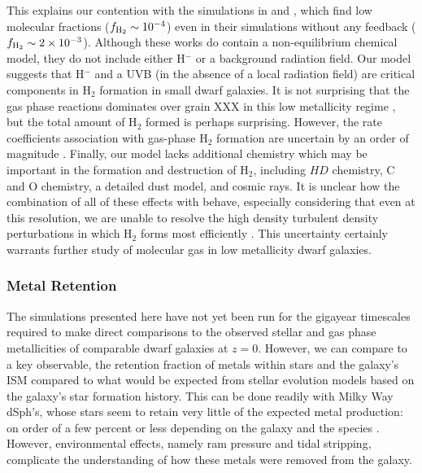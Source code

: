 \documentclass[twocolumn]{aastex61}
\begin{document}
This explains our contention with the simulations in \citet{Hu2016} and \citet{Hu2017}, which find low molecular fractions ($f_{\rm H_2} \sim 10^{-4}$) even in their simulations without any feedback ($f_{\rm H_2} \sim 2 \times 10^{-3}$). Although these works do contain a non-equilibrium chemical model, they do not include either H$^{-}$ or a background radiation field. Our model suggests that H$^{-}$ and a UVB (in the absence of a local radiation field) are critical components in H$_2$ formation in small dwarf galaxies. It is not surprising that the gas phase reactions dominates over grain XXX in this low metallicity regime \citep{Glover2003}, but the total amount of H$_2$ formed is perhaps surprising. However, the rate coefficients association with gas-phase H$_2$ formation are uncertain by an order of magnitude \citep{Glover2006,Glover2007}.
Finally, our model lacks additional chemistry which may be important in the formation and destruction of H$_2$, including $HD$ chemistry, C and O chemistry, a detailed dust model, and cosmic rays. It is unclear how the combination of all of these effects with behave, especially considering that even at this resolution, we are unable to resolve the high density turbulent density perturbations in which H$_2$ forms most efficiently \citep{Glover2007}. This uncertainty certainly warrants further study of molecular gas in low metallicity dwarf galaxies.

\subsubsection{Metal Retention}
\label{sec:obs_metals}

The simulations presented here have not yet been run for the gigayear timescales required to make direct comparisons to the observed stellar and gas phase metallicities of comparable dwarf galaxies at $z = 0$. However, we can compare to a key observable, the retention fraction of metals within stars and the galaxy's ISM compared to what would be expected from stellar evolution models based on the galaxy's star formation history. This can be done readily with Milky Way dSph's, whose stars seem to retain very little of the expected metal production: on order of a few percent or less depending on the galaxy and the species \citep{Kirby2011-metals}. However, environmental effects, namely ram pressure and tidal stripping, complicate the understanding of how these metals were removed from the galaxy. 
\end{document}
